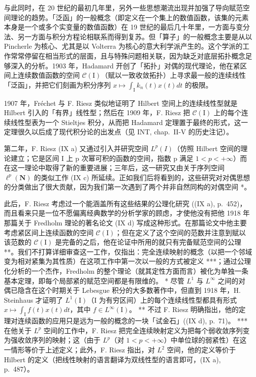与此同时，在 20 世纪的最初几年里，另外一些思想潮流出现并加强了导向赋范空间理论的趋势。「泛函」的一般概念（即定义在一个集上的数值函数，该集的元素本身是一个或多个实变量的数值函数）在 19 世纪的最后几十年里，一方面与变分法、另一方面与积分方程论相联系而得到复苏。但「算子」的一般概念主要是从以 Pincherle 为核心、尤其是以 Volterra 为核心的意大利学派产生的。这个学派的工作常常停留在相当形式的层面，且与特殊问题相关联，因为缺乏对底层拓扑概念足够深入的分析。1903 年，Hadamard 开创了「拓扑」对偶的现代理论，他在紧区间上连续数值函数的空间 \(\mathcal{C}(\mathrm{I})\)（赋以一致收敛拓扑）上寻求最一般的连续线性「泛函」，并把它们刻画为积分序列 \(x\mapsto \int_{\mathrm{I}}k_n(t)x(t)dt\) 的极限。

1907 年，Fréchet 与 F. Riesz 类似地证明了 Hilbert 空间上的连续线性型就是 Hilbert 引入的「有界」线性型；然后在 1909 年，F. Riesz 把 \(\mathcal{C}(\mathrm{I})\) 上的每个连续线性型表为一个 Stieltjes 积分，从而把 Hadamard 定理置于最终的形式，这一定理很久以后成了现代积分论的出发点（见 INT, chap.~II-V 的历史注记）。

第二年，F. Riesz (IX a) 又通过引入并研究空间 \(L^{p}(I)\)（仿照 Hilbert 空间的理论建立；它是区间 I 上 p 次幂可积的函数的空间，指数 p 满足 \(1 < p < +\infty\)）而在这一理论中取得了新的重要进展；三年后，这一研究又由关于序列空间 \(\ell^{p}(\mathbf{N})\) 的类似工作 (IX c) 所延续。正如我们后将看到的，这些研究对对偶思想的分类做出了很大贡献，因为我们第一次遇到了两个并非自然同构的对偶空间 *。

此后，F. Riesz 考虑过一个能涵盖所有这些结果的公理化研究 ((IX a), p.~452)，而且看来只是一位不愿偏离经典数学的分析学家的顾虑，才使他没有把他 1918 年那篇关于 Fredholm 理论的著名论文 (IX d) 写成这种形式。在那篇论文中他主要考虑紧区间上连续函数的空间 \(\mathcal{C}(\mathrm{I})\)；但在定义了这个空间的范数并注意到赋以该范数的 \(\mathcal{C}(\mathrm{I})\) 是完备的之后，他在论证中所用的就只有完备赋范空间的公理 **。我们不打算详细审查这一工作，仅指出：完全连续映射的概念（以把一个邻域变为相对紧集为其性质）在这项工作中第一次以一般的方式被定义 ***；通过公理化分析的一个杰作，Fredholm 的整个理论（就其定性方面而言）被化为单独一条基本定理，即每个局部紧的赋范空间都是有限维的。
* 尽管 \(L^1\) 与 \(L^\infty\) 之间的对偶已隐含在这个时期关于 Lebesgue 积分的大多数著作中，但直到 1918 年，H. Steinhaus 才证明了 \(L^1(\mathrm{I})\)（I 为有穷区间）上的每个连续线性型都具有形式 \(x\mapsto\int_{\mathrm{I}} f(t)x(t)dt\)，其中 \(f\in L^\infty(\mathrm{I})\)。
** 不过 F. Riesz 明确指出，他的定理对连续函数的应用只是远为一般的概念的一块「试金石」((IX d), p.~71)。
*** 在他关于 \(L^p\) 空间的工作中，F. Riesz 把完全连续映射定义为把每个弱收敛序列变为强收敛序列的映射；这（由于 \(L^p\)（对 \(1 < p < +\infty\)）中单位球的弱紧性）在这一情形等价于上述定义；此外，F. Riesz 指出，对 \(L^2\) 空间，他的定义等价于 Hilbert 的定义（把线性映射的语言翻译为双线性型的语言即可，(IX a), p.~487）。

